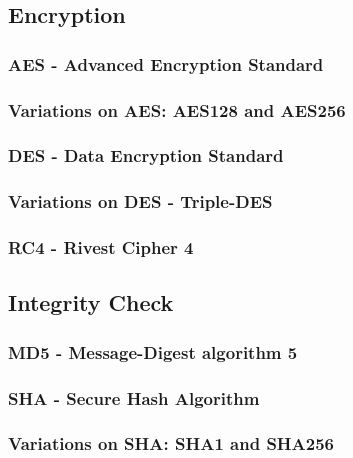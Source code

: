 \subsection{Encryption}

\subsubsection{AES - Advanced Encryption Standard}

\subsubsection{Variations on AES: AES128 and AES256}

\subsubsection{DES - Data Encryption Standard}

\subsubsection{Variations on DES - Triple-DES}

\subsubsection{RC4 - Rivest Cipher 4}

\subsection{Integrity Check}

\subsubsection{MD5 - Message-Digest algorithm 5}

\subsubsection{SHA - Secure Hash Algorithm}

\subsubsection{Variations on SHA: SHA1 and SHA256}
